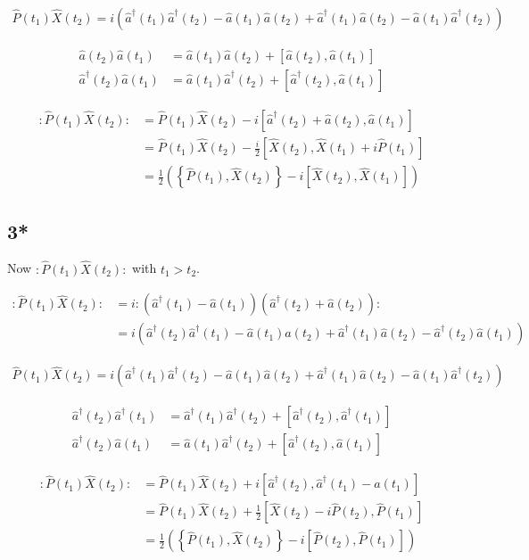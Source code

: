 \documentclass[12pt]{article}
\newcommand{\ahat}{\hat{a}}
\newcommand{\adag}{\ahat^{\dag}}
\begin{document}
\begin{align}
\hat{P}(t_1)\hat{X}(t_2) = i(\adag(t_1)\adag(t_2) - \ahat(t_1)\ahat(t_2) + \adag(t_1)\ahat(t_2) - \ahat(t_1)\adag(t_2))
\end{align}

\begin{align}
\ahat(t_2)\ahat(t_1) &= \ahat(t_1)\ahat(t_2) + \left[\ahat(t_2),\ahat(t_1)\right]\\
\adag(t_2)\ahat(t_1) &= \ahat(t_1)\adag(t_2) + \left[\adag(t_2),\ahat(t_1)\right]
\end{align}

\begin{align}
:\hat{P}(t_1)\hat{X}(t_2): &= \hat{P}(t_1)\hat{X}(t_2) - i\left[\adag(t_2) + \ahat(t_2), \ahat(t_1)\right]\\
&= \hat{P}(t_1)\hat{X}(t_2) - \frac{i}{2} \left[\hat{X}(t_2), \hat{X}(t_1) + i \hat{P}(t_1)\right]\\
&= \frac{1}{2}\left(\left\{\hat{P}(t_1),\hat{X}(t_2)\right\} - i \left[\hat{X}(t_2),\hat{X}(t_1)\right]\right)
\end{align}

\pagebreak

\subsection{3*}

Now $:\hat{P}(t_1)\hat{X}(t_2):$ with $t_1>t_2$.

\begin{align}
:\hat{P}(t_1)\hat{X}(t_2): &= i:(\adag(t_1)-\ahat(t_1))(\adag(t_2)+\ahat(t_2)):\\
&= i(\adag(t_2)\adag(t_1) - \ahat(t_1)\ahat(t_2) + \adag(t_1)\ahat(t_2) - \adag(t_2)\ahat(t_1))
\end{align}

\begin{align}
\hat{P}(t_1)\hat{X}(t_2) = i(\adag(t_1)\adag(t_2) - \ahat(t_1)\ahat(t_2) + \adag(t_1)\ahat(t_2) - \ahat(t_1)\adag(t_2))
\end{align}

\begin{align}
\adag(t_2)\adag(t_1) &= \adag(t_1)\adag(t_2) + \left[\adag(t_2),\adag(t_1)\right]\\
\adag(t_2)\ahat(t_1) &= \ahat(t_1)\adag(t_2) + \left[\adag(t_2),\ahat(t_1)\right]
\end{align}

\begin{align}
:\hat{P}(t_1)\hat{X}(t_2): &= \hat{P}(t_1)\hat{X}(t_2) + i\left[\adag(t_2),\adag(t_1) - \ahat(t_1)\right]\\
&= \hat{P}(t_1)\hat{X}(t_2) + \frac{1}{2} \left[\hat{X}(t_2)-i\hat{P}(t_2),\hat{P}(t_1)\right]\\
&= \frac{1}{2}\left(\left\{\hat{P}(t_1),\hat{X}(t_2)\right\} - i \left[\hat{P}(t_2),\hat{P}(t_1)\right]\right)
\end{align}
\end{document}
